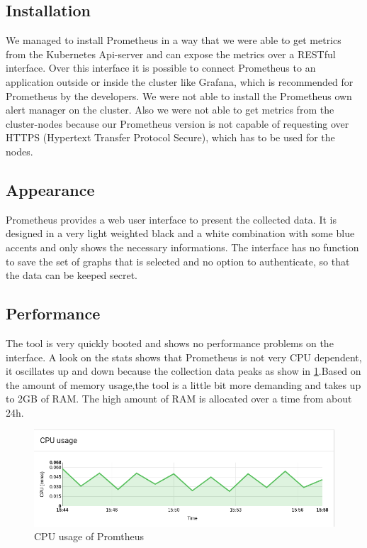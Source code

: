 \subsection{Installation}
We managed to install Prometheus in a way that we were able to get metrics from the  Kubernetes Api-server and can expose the metrics over a RESTful interface. Over this interface it is possible to connect Prometheus to an application outside or inside the cluster like Grafana, which is recommended for Prometheus by the developers. We were not able to install the Prometheus own alert manager on the cluster. Also we were not able to get metrics from the cluster-nodes because our Prometheus version is not capable of requesting over HTTPS (Hypertext Transfer Protocol Secure), which has to be used for the nodes. 
\subsection{Appearance}%
Prometheus provides a web user interface to present the collected data. It is designed in a very light weighted black and a white combination with some blue accents and only shows the necessary informations. The interface has no function to save the set of graphs that is selected and no option to authenticate, so that the data can be keeped secret. 
\subsection{Performance}
The tool is very quickly booted and shows no performance problems on the interface. A look on the stats shows that Prometheus is not very CPU dependent, it oscillates up and down because the collection data peaks as show in \cref{fig:Prometeus_Cpu}.Based on the amount of memory usage,the tool is a little bit more demanding and takes up to 2GB of RAM. The high amount of RAM is allocated over a time from about 24h. 
\begin{figure}
\centering
\includegraphics[width=1\linewidth]{Bilder/Performance/Prometeus_Cpu}
\caption{CPU usage of Promtheus}
\label{fig:Prometeus_Cpu}
\end{figure}
